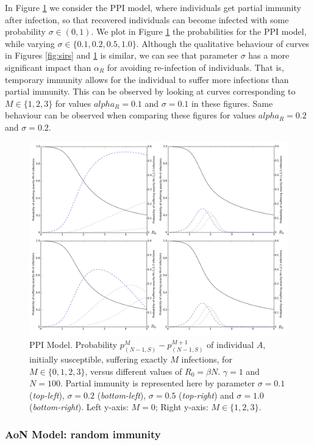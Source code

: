 \documentclass[preprint,12pt]{elsarticle}
\begin{document}
\par In Figure \ref{fig:siri} we consider the PPI model, where individuals get partial immunity after infection, so that recovered individuals can become infected with some probability $\sigma\in(0,1)$. We plot in Figure \ref{fig:siri} the probabilities for the PPI model, while varying $\sigma\in\{0.1,0.2,0.5,1.0\}$. Although the qualitative behaviour of curves in Figures \ref{fig:sirs} and \ref{fig:siri} is similar, we can see that parameter $\sigma$ has a more significant impact than $\alpha_R$ for avoiding re-infection of individuals. That is, temporary immunity allows for the individual to suffer more infections than partial immunity. This can be observed by looking at curves corresponding to $M\in\{1,2,3\}$ for values $alpha_R=0.1$ and $\sigma=0.1$ in these figures. Same behaviour can be observed when comparing these figures for values $alpha_R=0.2$ and $\sigma=0.2$. 
\begin{figure}[h!]
  \centering
 \includegraphics[width=\textwidth]{PPI.jpg}
 \caption{PPI Model. Probability $p_{(N-1,S)}^M-p_{(N-1,S)}^{M+1}$ of individual $A$, initially susceptible, suffering exactly $M$ infections, for $M\in\{0,1,2,3\}$, versus different values of $R_0=\beta N$. $\gamma=1$ and $N=100$.
Partial immunity is represented here by parameter $\sigma=0.1$ ({\it top-left}), $\sigma=0.2$ ({\it bottom-left}), $\sigma=0.5$ ({\it top-right}) and
$\sigma=1.0$ ({\it bottom-right}). Left y-axis: $M=0$; Right y-axis: $M\in\{1,2,3\}$.}
 \label{fig:siri}
\end{figure}

\subsubsection{AoN Model: random immunity}
\end{document}
